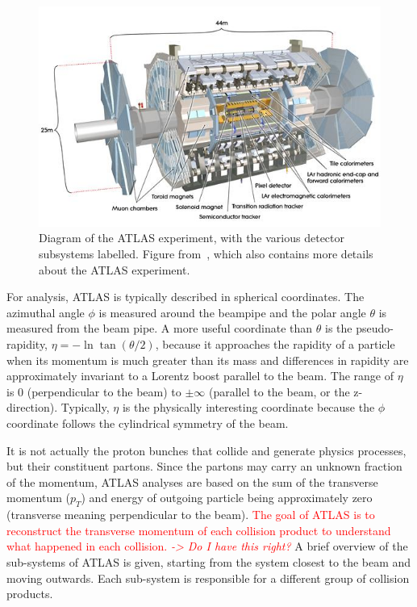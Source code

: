 \begin{figure}
    \centering
    \includegraphics[width = \textwidth]{figures/atlas_diagram.png}
    \caption{Diagram of the ATLAS experiment, with the various detector subsystems labelled. Figure from~\cite{collaboration_atlas_2008}, which also contains more details about the ATLAS experiment.}
    \label{fig:atlas}
\end{figure}

For analysis, ATLAS is typically described in spherical coordinates. The azimuthal angle $\phi$ is measured around the beampipe and the polar angle $\theta$ is measured from the beam pipe. A more useful coordinate than $\theta$ is the pseudo-rapidity, $\eta = -\ln\tan\left(\theta/2\right)$, because it approaches the rapidity of a particle when its momentum is much greater than its mass and differences in rapidity are approximately invariant to a Lorentz boost parallel to the beam. The range of $\eta$ is 0 (perpendicular to the beam) to $\pm\infty$ (parallel to the beam, or the z-direction). Typically, $\eta$ is the physically interesting coordinate because the $\phi$ coordinate follows the cylindrical symmetry of the beam.

It is not actually the proton bunches that collide and generate physics processes, but their constituent partons. Since the partons may carry an unknown fraction of the momentum, ATLAS analyses are based on the sum of the transverse momentum ($p_T$) and energy of outgoing particle being approximately zero (transverse meaning perpendicular to the beam). \textcolor{red}{The goal of ATLAS is to reconstruct the transverse momentum of each collision product to understand what happened in each collision. \textit{-> Do I have this right?}} A brief overview of the sub-systems of ATLAS is given, starting from the system closest to the beam and moving outwards. Each sub-system is responsible for a different group of collision products.

